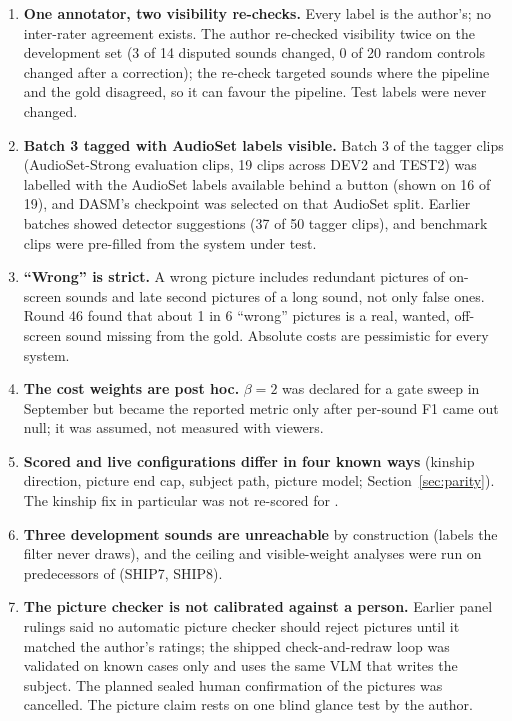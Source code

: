 \begin{enumerate}[label=\textbf{D\arabic*.}, leftmargin=*]
        and misses the third by 0.011.
  \item \textbf{One annotator, two visibility re-checks.} Every label is the author's; no inter-rater agreement exists.
        The author re-checked visibility twice on the development set (3 of 14 disputed sounds changed, 0 of 20 random
        controls changed after a correction); the re-check targeted sounds where the pipeline and the gold disagreed,
        so it can favour the pipeline. Test labels were never changed.
  \item \textbf{Batch 3 tagged with AudioSet labels visible.} Batch 3 of the tagger clips (AudioSet-Strong evaluation
        clips, 19 clips across DEV2 and TEST2) was labelled with the AudioSet labels available behind a button (shown on
        16 of 19), and DASM's checkpoint was selected on that AudioSet split. Earlier batches showed detector suggestions
        (37 of 50 tagger clips), and benchmark clips were pre-filled from the system under test.
  \item \textbf{``Wrong'' is strict.} A wrong picture includes redundant pictures of on-screen sounds and late second
        pictures of a long sound, not only false ones. Round 46 found that about 1 in 6 ``wrong'' pictures is a real,
        wanted, off-screen sound missing from the gold. Absolute costs are pessimistic for every system.
  \item \textbf{The cost weights are post hoc.} $\beta = 2$ was declared for a gate sweep in September but became the
        reported metric only after per-sound F1 came out null; it was assumed, not measured with viewers.
  \item \textbf{Scored and live configurations differ in four known ways} (kinship direction, picture end cap, subject
        path, picture model; Section~\ref{sec:parity}). The kinship fix in particular was not re-scored for \Dp.
  \item \textbf{Three development sounds are unreachable} by construction (labels the filter never draws), and the
        ceiling and visible-weight analyses were run on predecessors of \Dp{} (SHIP7, SHIP8).
  \item \textbf{The picture checker is not calibrated against a person.} Earlier panel rulings said no automatic
        picture checker should reject pictures until it matched the author's ratings; the shipped check-and-redraw loop
        was validated on known cases only and uses the same VLM that writes the subject. The planned sealed human
        confirmation of the pictures was cancelled. The picture claim rests on one blind glance test by the author.

\end{enumerate}
